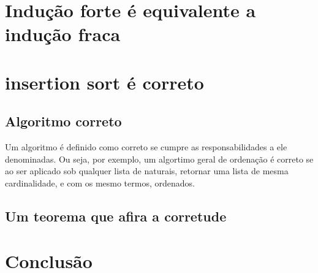 \documentclass[a4paper, 10pt]{article}
\begin{document}
\section{Indução forte é equivalente a indução fraca}

\section{insertion sort é correto}

\subsection{Algoritmo correto}

Um algoritmo é definido como correto se cumpre as responsabilidades a ele denominadas. Ou seja, por exemplo, um algortimo geral de ordenação é correto se ao ser aplicado sob qualquer lista de naturais, retornar uma lista de mesma cardinalidade, e com os mesmo termos, ordenados. 

\subsection{Um teorema que afira a corretude}

\section{Conclusão}
\end{document}
